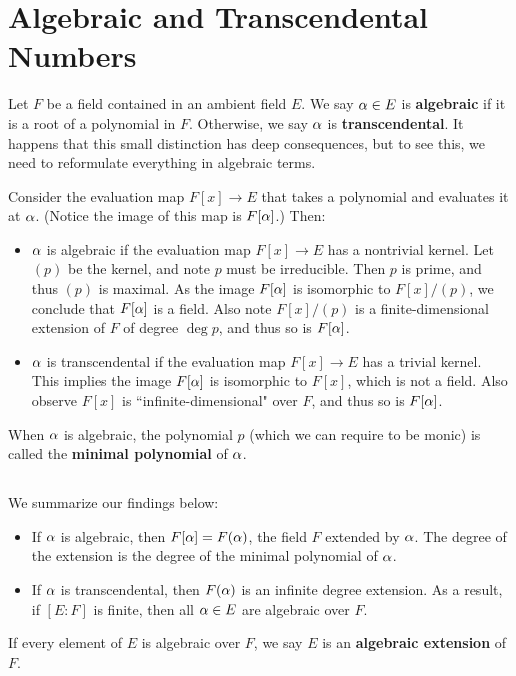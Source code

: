 \section{Algebraic and Transcendental Numbers}
Let $F$ be a field contained in an ambient field $E$. We say $\alpha \in E$ is \textbf{algebraic} if it is a root of a polynomial in $F$. Otherwise, we say $\alpha$ is \textbf{transcendental}. It happens that this small distinction has deep consequences, but to see this, we need to reformulate everything in algebraic terms.

Consider the evaluation map $F[x] \rightarrow E$ that takes a polynomial and evaluates it at $\alpha$. (Notice the image of this map is $F[\alpha]$.) Then:
\begin{itemize}
    \item $\alpha$ is algebraic if the evaluation map $F[x] \rightarrow E$ has a nontrivial kernel. Let $(p)$ be the kernel, and note $p$ must be irreducible. Then $p$ is prime, and thus $(p)$ is maximal. As the image $F[\alpha]$ is isomorphic to $F[x]/(p)$, we conclude that $F[\alpha]$ is a field. Also note $F[x]/(p)$ is a finite-dimensional extension of $F$ of degree $\deg p$, and thus so is $F[\alpha]$.
    \item $\alpha$ is transcendental if the evaluation map $F[x] \rightarrow E$ has a trivial kernel. This implies the image $F[\alpha]$ is isomorphic to $F[x]$, which is not a field. Also observe $F[x]$ is ``infinite-dimensional" over $F$, and thus so is $F[\alpha]$.
\end{itemize}
When $\alpha$ is algebraic, the polynomial $p$ (which we can require to be monic) is called the \textbf{minimal polynomial} of $\alpha$.

\subsection{}
We summarize our findings below:
\begin{itemize}
    \item If $\alpha$ is algebraic, then $F[\alpha] = F(\alpha)$, the field $F$ extended by $\alpha$. The degree of the extension is the degree of the minimal polynomial of $\alpha$.
    \item If $\alpha$ is transcendental, then $F(\alpha)$ is an infinite degree extension. As a result, if $[E : F]$ is finite, then all $\alpha \in E$ are algebraic over $F$.
\end{itemize}
If every element of $E$ is algebraic over $F$, we say $E$ is an \textbf{algebraic extension} of $F$.
